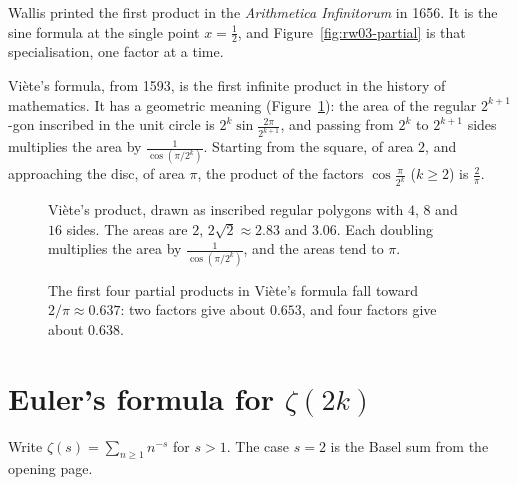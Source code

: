 Wallis printed the first product in the \emph{Arithmetica Infinitorum} in 1656. It is the sine formula at the single point $x=\frac12$, and Figure~\ref{fig:rw03-partial} is that specialisation, one factor at a time.


Vi\`ete's formula, from 1593, is the first infinite product in the history of mathematics. It has a geometric meaning
(Figure~\ref{fig:viete}): the area of the regular $2^{k+1}$-gon inscribed in the unit circle is
$2^{k}\sin\frac{2\pi}{2^{k+1}}$, and passing from $2^k$ to $2^{k+1}$ sides multiplies the area by $\frac1{\cos(\pi/2^k)}$. Starting
from the square, of area $2$, and approaching the disc, of area $\pi$, the product of the factors $\cos\frac\pi{2^k}$ ($k\ge2$)
is $\frac2\pi$.

\begin{figure}[ht]
\centering
{}
\caption{Vi\`ete's product, drawn as inscribed regular polygons with $4$, $8$ and $16$ sides. The areas are $2$, $2\sqrt2\approx2.83$ and $3.06$. Each doubling multiplies the area by $\frac1{\cos(\pi/2^k)}$, and the areas tend to $\pi$.}
\label{fig:viete}
\end{figure}

\begin{figure}[ht]
\centering
{}
\caption{The first four partial products in Vi\`ete's formula fall toward $2/\pi\approx 0.637$: two factors give about $0.653$, and four factors give about $0.638$.}
\label{fig:rw03-wallis}
\end{figure}

\section{Euler's formula for \texorpdfstring{$\zeta(2k)$}{zeta(2k)}}

Write $\zeta(s)=\sum_{n\ge1}n^{-s}$ for $s>1$. The case $s=2$ is the Basel sum from the opening page.


